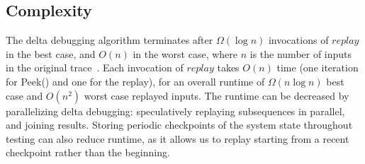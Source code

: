 \subsection{Complexity}
\label{subsec:complexity}

The delta debugging algorithm terminates after $\Omega(\log n)$
invocations of $replay$ in the best case, and $O(n)$ in the worst case, where $n$ is the number of inputs in the original
trace~\cite{Zeller:1999:YMP:318773.318946}.
Each invocation of $replay$ takes $O(n)$ time
(one iteration for {\sc Peek()} and one for the replay),
for an overall runtime of $\Omega(n \log n)$ best case and $O(n^2)$ worst case replayed inputs.
The runtime can be decreased by parallelizing delta debugging:
speculatively replaying subsequences in parallel, and joining results.
Storing periodic checkpoints of the system state throughout testing can also reduce runtime, as it
allows us to replay starting from a recent checkpoint rather than the
beginning.%




